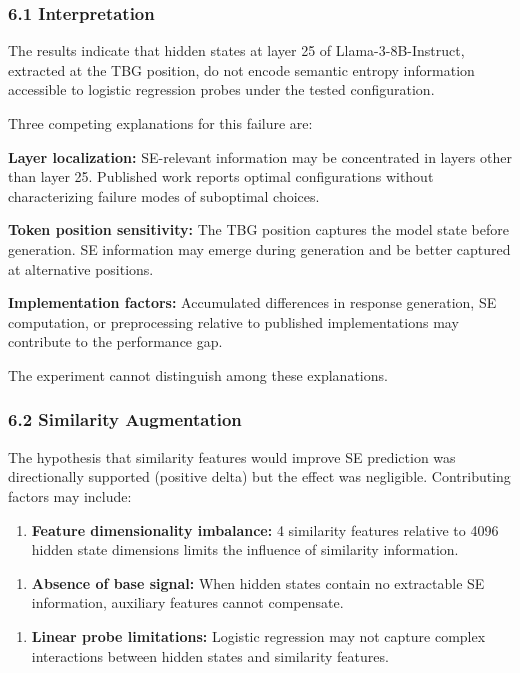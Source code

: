 
\subsubsection{6.1 Interpretation}

The results indicate that hidden states at layer 25 of Llama-3-8B-Instruct, extracted at the TBG position, do not encode semantic entropy information accessible to logistic regression probes under the tested configuration.

Three competing explanations for this failure are:

\textbf{Layer localization:} SE-relevant information may be concentrated in layers other than layer 25. Published work reports optimal configurations without characterizing failure modes of suboptimal choices.

\textbf{Token position sensitivity:} The TBG position captures the model state before generation. SE information may emerge during generation and be better captured at alternative positions.

\textbf{Implementation factors:} Accumulated differences in response generation, SE computation, or preprocessing relative to published implementations may contribute to the performance gap.

The experiment cannot distinguish among these explanations.

\subsubsection{6.2 Similarity Augmentation}

The hypothesis that similarity features would improve SE prediction was directionally supported (positive delta) but the effect was negligible. Contributing factors may include:

\begin{enumerate}
\item \textbf{Feature dimensionality imbalance:} 4 similarity features relative to 4096 hidden state dimensions limits the influence of similarity information.
\end{enumerate}

\begin{enumerate}
\item \textbf{Absence of base signal:} When hidden states contain no extractable SE information, auxiliary features cannot compensate.
\end{enumerate}

\begin{enumerate}
\item \textbf{Linear probe limitations:} Logistic regression may not capture complex interactions between hidden states and similarity features.
\end{enumerate}

